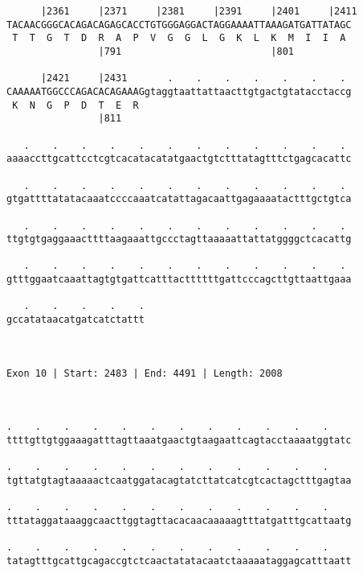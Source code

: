 \documentclass{article}
\begin{document}
\begin{Verbatim}
      |2361     |2371     |2381     |2391     |2401     |2411
TACAACGGGCACAGACAGAGCACCTGTGGGAGGACTAGGAAAATTAAAGATGATTATAGC
 T  T  G  T  D  R  A  P  V  G  G  L  G  K  L  K  M  I  I  A 
                |791                          |801          
  
      |2421     |2431       .    .    .    .    .    .    . 
CAAAAATGGCCCAGACACAGAAAGgtaggtaattattaacttgtgactgtatacctaccg
 K  N  G  P  D  T  E  R                                     
                |811                                        
  
   .    .    .    .    .    .    .    .    .    .    .    . 
aaaaccttgcattcctcgtcacatacatatgaactgtctttatagtttctgagcacattc
                                                            
   .    .    .    .    .    .    .    .    .    .    .    . 
gtgattttatatacaaatccccaaatcatattagacaattgagaaaatactttgctgtca
                                                            
   .    .    .    .    .    .    .    .    .    .    .    . 
ttgtgtgaggaaacttttaagaaattgccctagttaaaaattattatggggctcacattg
                                                            
   .    .    .    .    .    .    .    .    .    .    .    . 
gtttggaatcaaattagtgtgattcatttacttttttgattcccagcttgttaattgaaa
                                                            
   .    .    .    .    .
gccatataacatgatcatctattt
                        
                        
 
Exon 10 | Start: 2483 | End: 4491 | Length: 2008



.    .    .    .    .    .    .    .    .    .    .    .    
ttttgttgtggaaagatttagttaaatgaactgtaagaattcagtacctaaaatggtatc
                                                            
.    .    .    .    .    .    .    .    .    .    .    .    
tgttatgtagtaaaaactcaatggatacagtatcttatcatcgtcactagctttgagtaa
                                                            
.    .    .    .    .    .    .    .    .    .    .    .    
tttataggataaaggcaacttggtagttacacaacaaaaagtttatgatttgcattaatg
                                                            
.    .    .    .    .    .    .    .    .    .    .    .    
tatagtttgcattgcagaccgtctcaactatatacaatctaaaaataggagcatttaatt
                                                            

\end{Verbatim}
\end{document}
